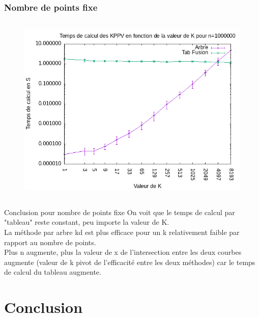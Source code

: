 \documentclass{beamer}
\begin{document}
\begin{frame}
\frametitle{Nombre de points fixe}
\begin{columns}
    \begin{figure}
      \includegraphics[width=\textwidth]{img_graph/graph_n_1000000.png}
    \end{figure}
\end{columns}
\end{frame}


\begin{frame}
\begin{block}{Conclusion pour nombre de points fixe}
On voit que le temps de calcul par "tableau" reste constant, peu importe la valeur de K.\\
La méthode par arbre kd est plus efficace pour un k relativement faible par rapport au nombre de points.\\
Plus n augmente, plus la valeur de x de l'intersection entre les deux courbes augmente (valeur de k pivot de l'efficacité entre les deux méthodes) car le temps de calcul du tableau augmente.
\end{block}
\end{frame}


\section{ Conclusion }
\end{document}
